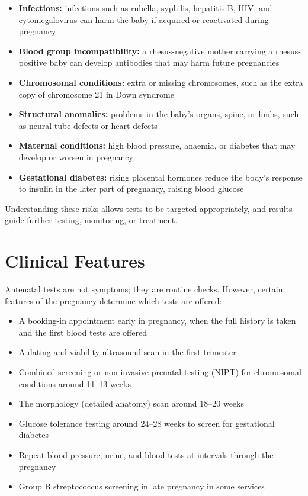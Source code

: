 \begin{itemize}
    \item \textbf{Infections:} infections such as rubella, syphilis, hepatitis B, HIV, and cytomegalovirus can harm the baby if acquired or reactivated during pregnancy
    \item \textbf{Blood group incompatibility:} a rhesus-negative mother carrying a rhesus-positive baby can develop antibodies that may harm future pregnancies
    \item \textbf{Chromosomal conditions:} extra or missing chromosomes, such as the extra copy of chromosome 21 in Down syndrome
    \item \textbf{Structural anomalies:} problems in the baby's organs, spine, or limbs, such as neural tube defects or heart defects
    \item \textbf{Maternal conditions:} high blood pressure, anaemia, or diabetes that may develop or worsen in pregnancy
    \item \textbf{Gestational diabetes:} rising placental hormones reduce the body's response to insulin in the later part of pregnancy, raising blood glucose
\end{itemize}

Understanding these risks allows tests to be targeted appropriately, and results guide further testing, monitoring, or treatment.

\section*{Clinical Features}
Antenatal tests are not symptoms; they are routine checks. However, certain features of the pregnancy determine which tests are offered:

\begin{itemize}
    \item A booking-in appointment early in pregnancy, when the full history is taken and the first blood tests are offered
    \item A dating and viability ultrasound scan in the first trimester
    \item Combined screening or non-invasive prenatal testing (NIPT) for chromosomal conditions around 11--13 weeks
    \item The morphology (detailed anatomy) scan around 18--20 weeks
    \item Glucose tolerance testing around 24--28 weeks to screen for gestational diabetes
    \item Repeat blood pressure, urine, and blood tests at intervals through the pregnancy
    \item Group B streptococcus screening in late pregnancy in some services
\end{itemize}

